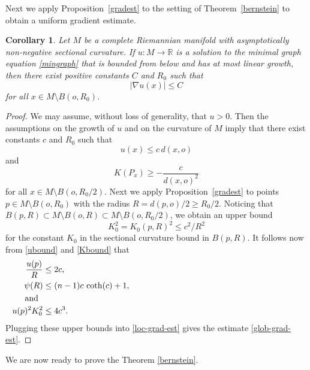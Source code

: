 \documentclass[10pt,a4paper,reqno]{amsart}
\newcommand{\R}{\mathbb{R}}
\numberwithin{equation}{section}
\theoremstyle{plain}
\newtheorem{cor}[thm]{Corollary}
\theoremstyle{definition}
\begin{document}
  Next we apply Proposition~\ref{gradest} to the setting of Theorem~\ref{bernstein} to obtain a uniform gradient estimate.
  \begin{cor}\label{cor-glob-grad-est}
  Let $M$ be a complete Riemannian manifold with asymptotically non-negative sectional curvature. 
  If $u\colon M\to \R$ is a solution to the minimal graph equation \eqref{mingraph} that is bounded from below and has 
    at most linear growth, then there exist positive constants $C$ and $R_0$ such that
    \begin{equation}\label{glob-grad-est}
    |\nabla u(x)|\le C
    \end{equation}
    for all $x\in M\setminus B(o,R_0)$.
  \end{cor}
  \begin{proof}
We may assume, without loss of generality, that $u>0$. Then the assumptions on the growth of $u$ and on the curvature of $M$ imply that
  there exist constants $c$ and $R_0$ such that
\begin{equation}\label{ubound}
u(x)\le c\,d(x,o)
\end{equation}
and
\[
K(P_x)\ge -\frac{c}{d(x,o)^2}
\]
for all $x\in M\setminus B(o,R_0/2)$.  
Next we apply 
Proposition~\ref{gradest} to points $p\in M\setminus B(o,R_0)$ with the radius $R=d(p,o)/2\ge R_0/2$. Noticing that 
$B(p,R)\subset M\setminus B(o,R)\subset M\setminus B(o,R_0/2)$, we obtain an upper bound
\begin{equation}\label{Kbound}
K_0^2=K_0(p,R)^2\le c^2/R^2
\end{equation} 
for the constant $K_0$ in the sectional curvature bound in $B(p,R)$. It follows now from \eqref{ubound} and \eqref{Kbound} 
that 
\begin{align*}
\frac{u(p)}{R}&\le 2c,\\
\psi(R)&\le (n-1)c\,\coth(c)+1,\\
\noalign{and}
u(p)^2K_0^2&\le 4c^3.
\end{align*}
Plugging these upper bounds into \eqref{loc-grad-est} gives the estimate \eqref{glob-grad-est}. 
  \end{proof}
 
    
   We are now ready to prove the Theorem \ref{bernstein}.
  
\end{document}
